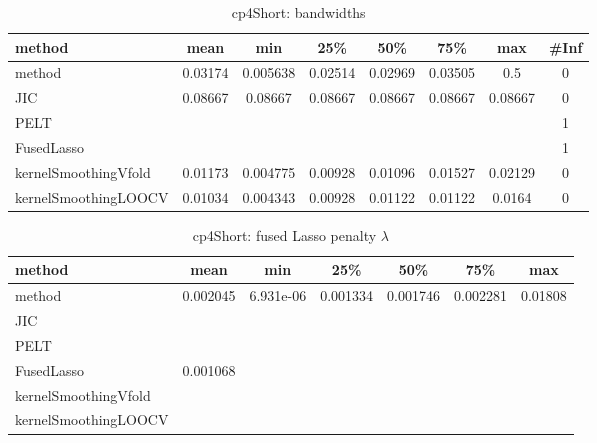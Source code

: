 \begin{table}[ht]
\centering
\begin{tabular}{l|c|ccccc|c}
  \hline
method & mean & min & 25\% & 50\% & 75\% & max & \#Inf \\ 
  \hline
method & 0.03174 & 0.005638 & 0.02514 & 0.02969 & 0.03505 &   0.5 &   0 \\ 
  JIC & 0.08667 & 0.08667 & 0.08667 & 0.08667 & 0.08667 & 0.08667 &   0 \\ 
  PELT &  &  &  &  &  &  &   1 \\ 
  FusedLasso &  &  &  &  &  &  &   1 \\ 
  kernelSmoothingVfold & 0.01173 & 0.004775 & 0.00928 & 0.01096 & 0.01527 & 0.02129 &   0 \\ 
  kernelSmoothingLOOCV & 0.01034 & 0.004343 & 0.00928 & 0.01122 & 0.01122 & 0.0164 &   0 \\ 
   \hline
\end{tabular}
\caption{cp4Short: bandwidths} 
\label{tab:cp4ShortBandwidths}
\end{table}
\begin{table}[ht]
\centering
\begin{tabular}{l|c|ccccc}
  \hline
method & mean & min & 25\% & 50\% & 75\% & max \\ 
  \hline
method & 0.002045 & 6.931e-06 & 0.001334 & 0.001746 & 0.002281 & 0.01808 \\ 
  JIC &  &  &  &  &  &  \\ 
  PELT &  &  &  &  &  &  \\ 
  FusedLasso & 0.001068 &  &  &  &  &  \\ 
  kernelSmoothingVfold &  &  &  &  &  &  \\ 
  kernelSmoothingLOOCV &  &  &  &  &  &  \\ 
   \hline
\end{tabular}
\caption{cp4Short: fused Lasso penalty $\lambda$} 
\label{tab:cp4ShortLambdas}
\end{table}
